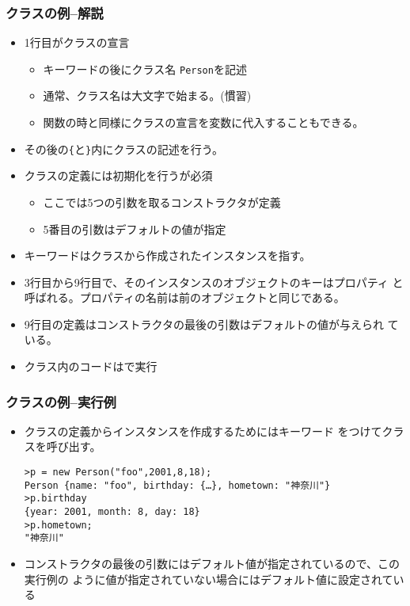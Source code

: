 \begin{frame}[containsverbatim]
 \frametitle{クラスの例--解説}
\begin{itemize}
 \item 1行目がクラスの宣言
       \begin{itemize}
        \item キーワードの後にクラス名
       \texttt{Person}を記述
        \item 通常、クラス名は大文字で始まる。(慣習)
        \item 関数の時と同様にクラスの宣言を変数に代入することもできる。
       \end{itemize}
 \item その後の\Verb+{+と\Verb+}+内にクラスの記述を行う。
 \item クラスの定義には初期化を行うが必須
       \begin{itemize}
        \item ここでは5つの引数を取るコンストラクタが定義
        \item 5番目の引数はデフォルトの値が指定
       \end{itemize}
 \item キーワードはクラスから作成されたインスタンスを指す。
 \item 3行目から9行目で、そのインスタンスのオブジェクトのキーはプロパティ
			 と呼ばれる。プロパティの名前は前のオブジェクトと同じである。
 \item 9行目の定義はコンストラクタの最後の引数はデフォルトの値が与えられ
			 ている。
 \item クラス内のコードは\Strict で実行
\end{itemize}
\end{frame}
\begin{frame}[containsverbatim]
 \frametitle{クラスの例--実行例}
 \begin{itemize}
  \item クラスの定義からインスタンスを作成するためにはキーワード
        をつけてクラスを呼び出す。
        {\small
\begin{Verbatim}
>p = new Person("foo",2001,8,18);
Person {name: "foo", birthday: {…}, hometown: "神奈川"}
>p.birthday
{year: 2001, month: 8, day: 18}
>p.hometown;
"神奈川"
\end{Verbatim}
        }
  \item コンストラクタの最後の引数にはデフォルト値が指定されているので、この実行例の
ように値が指定されていない場合にはデフォルト値に設定されている
 \end{itemize}
\end{frame}
